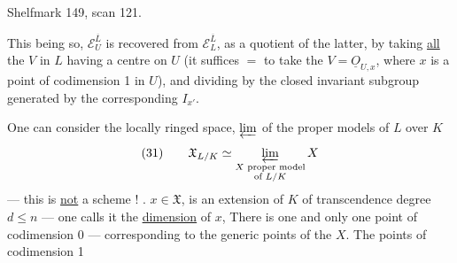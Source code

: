 Shelfmark 149, scan 121.

This being so, $\mathcal E_U^{\overline L}$ is recovered from $\mathcal E_L^{\overline L}$, as a quotient of the latter, by taking \uline{all} the $V$ in $L$ having a centre on $U$ (it suffices $=$ to take the $V=\underline{O}_{U,x}$, where $x$ is a point of codimension 1 in $U$), and dividing by the closed invariant subgroup generated by the corresponding $I_{x'}$.

One can consider the locally ringed space, $\varprojlim$ of the  proper models of $L$ over $K$
\[
(31)\qquad\mathfrak X_{L/K}\simeq\varprojlim_{\substack{X\text{ proper model}\\\text{of }L/K}}X
\]
--- this is \uline{not} a scheme ! .  
$x\in\mathfrak X$,   is an extension of $K$ of transcendence degree $d\leq n$ --- one calls it the \uline{dimension} of $x$,  There is one and only one point of codimension 0 --- corresponding to the generic points of the $X$. The points of codimension 1
